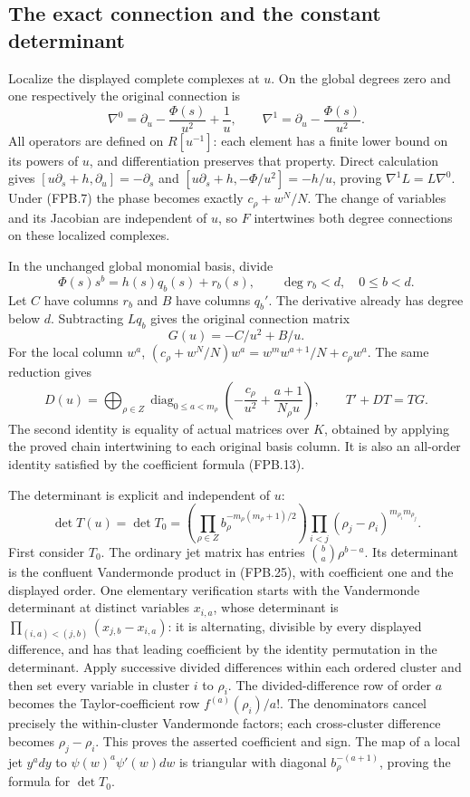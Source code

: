 \subsection{The exact connection and the constant determinant}

Localize the displayed complete complexes at \(u\). On the global
degrees zero and one respectively the original connection is
\[
 \nabla^0=\partial_u-\frac{\Phi(s)}{u^2}+\frac1u,
 \qquad
 \nabla^1=\partial_u-\frac{\Phi(s)}{u^2}.
 \tag{FPB.22}\label{eq:fpb-chain-connection}
\]
All operators are defined on \(R[u^{-1}]\): each element has a
finite lower bound on its powers of \(u\), and differentiation
preserves that property. Direct calculation gives
\([u\partial_s+h,\partial_u]=-\partial_s\) and
\([u\partial_s+h,-\Phi/u^2]=-h/u\), proving
\(\nabla^1L=L\nabla^0\). Under (FPB.7) the phase becomes exactly
\(c_\rho+w^N/N\). The change of variables and its Jacobian are
independent of \(u\), so \(F\) intertwines both degree connections
on these localized complexes.

In the unchanged global monomial basis, divide
\[
 \Phi(s)s^b=h(s)q_b(s)+r_b(s),\qquad \deg r_b<d,
 \quad 0\le b<d.
\]
Let \(C\) have columns \(r_b\) and \(B\) have columns
\(q_b'\). The derivative already has degree below \(d\).
Subtracting \(Lq_b\) gives the original connection matrix
\[
 G(u)=-C/u^2+B/u.
 \tag{FPB.23}\label{eq:fpb-G}
\]
For the local column \(w^a\),
\((c_\rho+w^N/N)w^a=w^m w^{a+1}/N+c_\rho w^a\).
The same reduction gives
\[
 D(u)=\bigoplus_{\rho\in Z}
  \operatorname{diag}_{0\le a<m_\rho}
    \left(-\frac{c_\rho}{u^2}
               +\frac{a+1}{N_\rho u}\right),
 \qquad T'+DT=TG.
 \tag{FPB.24}\label{eq:fpb-gauge}
\]
The second identity is equality of actual matrices over \(K\),
obtained by applying the proved chain intertwining to each original
basis column. It is also an all-order identity satisfied by the
coefficient formula (FPB.13).

The determinant is explicit and independent of \(u\):
\[
 \boxed{\displaystyle
 \det T(u)=\det T_0
   =\left(\prod_{\rho\in Z}
       b_\rho^{-m_\rho(m_\rho+1)/2}\right)
      \prod_{i<j}(\rho_j-\rho_i)^{m_{\rho_i}m_{\rho_j}}.}
 \tag{FPB.25}\label{eq:fpb-det}
\]
First consider \(T_0\). The ordinary jet matrix has entries
\(\binom ba\rho^{b-a}\). Its determinant is the confluent
Vandermonde product in (FPB.25), with coefficient one and the displayed
order. One elementary verification starts with the Vandermonde
determinant at distinct variables \(x_{i,a}\), whose determinant is
\(\prod_{(i,a)<(j,b)}(x_{j,b}-x_{i,a})\): it is alternating, divisible
by every displayed difference, and has that leading coefficient by
the identity permutation in the determinant. Apply successive divided
differences within each ordered cluster and then set every variable
in cluster \(i\) to \(\rho_i\). The divided-difference row of order
\(a\) becomes the Taylor-coefficient row \(f^{(a)}(\rho_i)/a!\).
The denominators cancel precisely the within-cluster Vandermonde
factors; each cross-cluster difference becomes \(\rho_j-\rho_i\).
This proves the asserted coefficient and sign. The map of a local
jet \(y^a dy\) to \(\psi(w)^a\psi'(w)dw\) is triangular with
diagonal \(b_\rho^{-(a+1)}\), proving the formula for \(\det T_0\).

